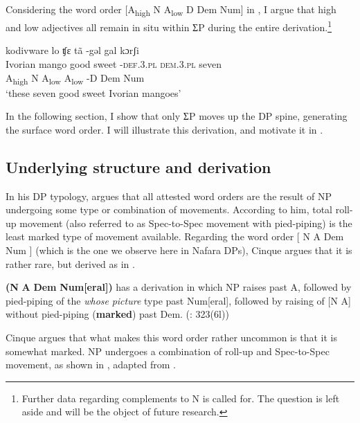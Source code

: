 \documentclass[output=paper]{langscibook}
\begin{document}
Considering the word order [A\textsubscript{high}  N  A\textsubscript{low}  D  Dem  Num] in , I argue that high and low adjectives all remain in situ within ƩP during the entire derivation.\footnote{Further data regarding complements to N is called for. The question is left aside and will be the object of future research.}  


\ea\label{ex:baron:14}
\glll kodivware lo ʧɛ tã -gəl gal kɔrʃi\\
   Ivorian mango good sweet  -\textsc{def.3.pl} \textsc{dem.3.pl} seven\\
   A\textsubscript{high}   N  A\textsubscript{low}  A\textsubscript{low}  -D  Dem  Num\\
\glt ‘these seven good sweet Ivorian mangoes’
\z

In the following section, I show that only ƩP moves up the DP spine, generating the surface word order. I will illustrate this derivation, and motivate it in .

 
\subsection{Underlying structure and derivation} 
\label{sec:baron:2.2}
In his DP typology, \citet{Cinque2005} argues that all attested word orders are the result of NP undergoing some type or combination of movements. According to him, total roll-up movement (also referred to as Spec-to-Spec movement with pied-piping) is the least marked type of movement available. Regarding the word order [ N A Dem Num ] (which is the one we observe here in Nafara DPs), Cinque argues that it is rather rare, but derived as in .

\ea\label{ex:baron:15}
\textbf{(N} \textbf{A} \textbf{Dem} \textbf{Num[eral])} has a derivation in which NP raises past A, followed by pied-piping of the \textit{whose} \textit{picture} type past Num[eral], followed by raising of [N A] without  pied-piping (\textbf{marked}) past Dem.        (\citealt{Cinque2005}: 323(6l))
\z

Cinque argues that what makes this word order rather uncommon is that it is somewhat marked. NP undergoes a combination of roll-up and Spec-to-Spec movement, as shown in , adapted from \citet{Cinque2005}.
\end{document}
